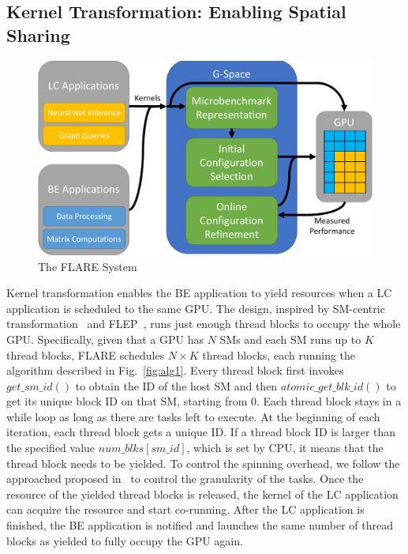 \subsection{Kernel Transformation:
				Enabling Spatial Sharing}


\begin{figure}
		\centering
		\includegraphics[width=\linewidth]{figures/system_diagram_cropped.pdf}
		\caption{The FLARE System}
		\label{fig:system}
		\vspace{-.2in}
		\end{figure}
		Kernel transformation enables the BE application to yield resources when a LC application is scheduled to the same GPU. The design, inspired by SM-centric transformation~\cite{Wu+:ICS15} and FLEP~\cite{Wu:ASPLOS2017}, runs just enough thread blocks to occupy the whole GPU. Specifically, given that a GPU has $N$ SMs and each SM runs up to $K$ thread blocks, FLARE schedules $N \times K$ thread blocks, each running the algorithm described in Fig.~\ref{fig:alg1}. Every thread block first invokes $get\_sm\_id()$ to obtain the ID of the host SM and then $atomic\_get\_blk\_id()$ to get its unique block ID on that SM, starting from 0. Each thread block stays in a while loop as long as there are tasks left to execute. At the beginning of each iteration, each thread block gets a unique ID. If a thread block ID is larger than the specified value $num\_blks[sm\_id]$, which is set by CPU, it means that the thread block needs to be yielded. To control the spinning overhead, we follow the approached proposed in~\cite{Wu:ASPLOS2017} to control the granularity of the tasks. Once the resource of the yielded thread blocks is released, the kernel of the LC application can acquire the resource and start co-running. After the LC application is finished, the BE application is notified and launches the same number of thread blocks as yielded to fully occupy the GPU again. 
		


